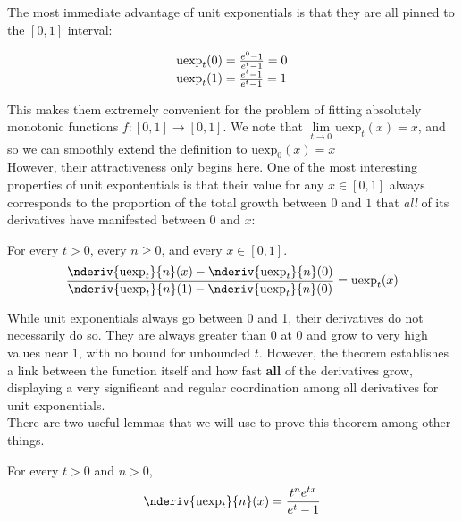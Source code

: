\documentclass[12pt,a4paper]{article}
\newcommand{\uexp}[1] {{\text{uexp}_{#1}}}
\begin{document}
The most immediate advantage of unit exponentials is that they are all pinned to the $[0,1]$ interval:

\begin{equation}
\begin{array}{l}
\uexp{t}(0) = {{e^0 -1} \over {e^t - 1}} = 0\\
\uexp{t}(1) = {{e^t -1} \over {e^t - 1}} = 1\\
\end{array}
\end{equation}

This makes them extremely convenient for the problem of fitting absolutely monotonic functions $f:[0,1] \rightarrow [0,1]$. We note that $\lim\limits_{t \to 0} \uexp{t}(x) = x$, and so we can smoothly extend the definition to $\uexp{0}(x) = x$\\

However, their attractiveness only begins here. One of the most interesting properties of unit expontentials is that their value for any $x \in [0,1]$ always corresponds to the proportion of the total growth between $0$ and $1$ that {\emph{all}} of its derivatives have manifested between $0$ and $x$:

\begin{theorem}
For every $t > 0$, every $n \geq 0$, and every $x \in [0,1]$.
\begin{equation}
{{\nderiv{\uexp{t}}{n}(x) - \nderiv{\uexp{t}}{n}(0)} \over {\nderiv{\uexp{t}}{n}(1) - \nderiv{\uexp{t}}{n}(0)}} = \uexp{t}(x)
\end{equation}
\end{theorem}

While unit exponentials always go between 0 and 1, their derivatives do not necessarily do so. They are always greater than $0$ at $0$ and grow to very high values near $1$, with no bound for unbounded $t$. However, the theorem establishes a link between the function itself and how fast {\bf{all}} of the derivatives grow, displaying a very significant and regular coordination among all derivatives for unit exponentials.\\

There are two useful lemmas that we will use to prove this theorem among other things.

\begin{lemma}
For every $t > 0$ and $n > 0$,
\begin{equation}
\nderiv{\uexp{t}}{n}(x) = {{t^n e^{tx}} \over {e^t - 1}}
\end{equation}
\end{lemma}
\end{document}
